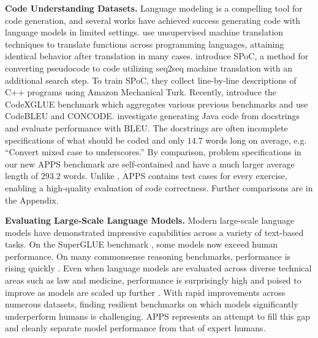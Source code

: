 \textbf{Code Understanding Datasets.}\quad
Language modeling is a compelling tool for code generation, and several works have achieved success generating code with language models in limited settings. \citet{lachaux2020unsupervised} use unsupervised machine translation techniques to translate functions across programming languages, attaining identical behavior after translation in many cases. \citet{NEURIPS2019_7298332f} introduce SPoC, a method for converting pseudocode to code utilizing seq2seq machine translation with an additional search step. To train SPoC, they collect line-by-line descriptions of C++ programs using Amazon Mechanical Turk. Recently, \citet{Lu2021CodeXGLUEAM} introduce the CodeXGLUE benchmark which aggregates various previous benchmarks and use CodeBLEU \citep{Ren2020CodeBLEUAM} and CONCODE. \citet{iyer-etal-2018-mapping} investigate generating Java code from docstrings and evaluate performance with BLEU. The docstrings are often incomplete specifications of what should be coded and only $14.7$ words long on average, e.g. ``Convert mixed case to underscores.'' By comparison, problem specifications in our new APPS benchmark are self-contained and have a much larger average length of $293.2$ words. Unlike \citet{iyer-etal-2018-mapping}, APPS contains test cases for every exercise, enabling a high-quality evaluation of code correctness. Further comparisons are in the Appendix.

\textbf{Evaluating Large-Scale Language Models.}\quad
Modern large-scale language models have demonstrated impressive capabilities across a variety of text-based tasks. On the SuperGLUE benchmark \citep{Wang2019SuperGLUEAS}, some models now exceed human performance. On many commonsense reasoning benchmarks, performance is rising quickly \citep{zellers2019hellaswag,huang2019cosmosqa,bisk2019physicaliqa}. Even when language models are evaluated across diverse technical areas such as law and medicine, performance is surprisingly high and poised to improve as models are scaled up further \citep{hendryckstest2021}. With rapid improvements across numerous datasets, finding resilient benchmarks on which models significantly underperform humans is challenging. APPS represents an attempt to fill this gap and cleanly separate model performance from that of expert humans.











